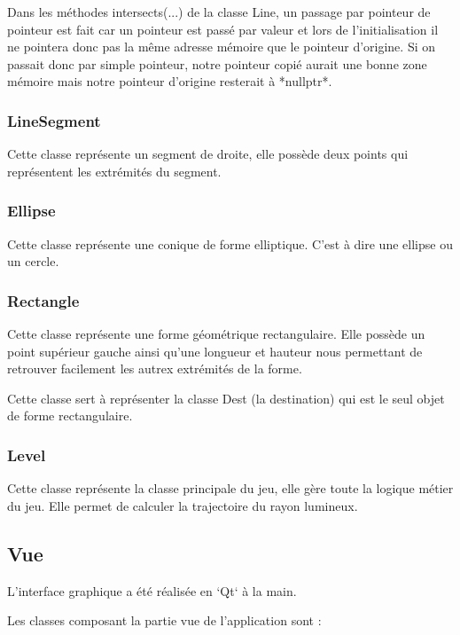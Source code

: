 \documentclass[]{article}
\begin{document}
Dans les méthodes intersects(...) de la classe Line, un passage
par pointeur de pointeur est fait car un pointeur est passé par 
valeur et lors de l'initialisation il ne pointera donc pas la même
adresse mémoire que le pointeur d'origine.
Si on passait donc par simple pointeur, notre pointeur copié
aurait une bonne zone mémoire mais notre pointeur d'origine
resterait à *nullptr*.

\subsubsection{LineSegment}

Cette classe représente un segment de droite, elle possède
deux points qui représentent les extrémités du segment.

\subsubsection{Ellipse}


Cette classe représente une conique de forme elliptique.
C'est à dire une ellipse ou un cercle.

\subsubsection{Rectangle}

Cette classe représente une forme géométrique rectangulaire.
Elle possède un point supérieur gauche ainsi qu'une longueur et hauteur 
nous permettant de retrouver facilement les autrex extrémités de la 
forme.

Cette classe sert à représenter la classe Dest (la destination) qui est
le seul objet de forme rectangulaire.

\subsubsection{Level}

Cette classe représente la classe principale du jeu, elle gère toute 
la logique métier du jeu. Elle permet de calculer la trajectoire
du rayon lumineux.
	
\subsection{Vue}


L’interface graphique a été réalisée en `Qt` à la main.

Les classes composant la partie vue de l’application sont :
\end{document}
